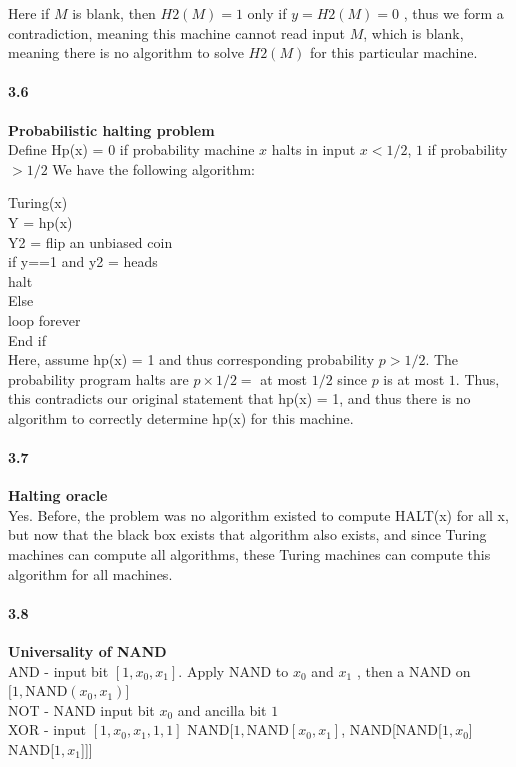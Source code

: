 Here if $M$ is blank, then $H2(M) = 1$ only if $y = H2(M) = 0$ , thus we form a contradiction, meaning this machine cannot read input $M$, which is blank, meaning there is no algorithm to solve $H2(M)$ for this particular machine.


\paragraph{3.6} \textbf{Probabilistic halting problem}
\\

Define Hp(x) = {$0$ if probability machine $x$ halts in input $x<1/2$, $1$ if probability $ > 1/2$ }
We have the following algorithm:

Turing(x) \\
Y = hp(x) \\
Y2 = flip an unbiased coin \\
if y==1 and y2 = heads \\
halt \\
Else \\
loop forever \\
End if\\

Here, assume hp(x) = 1 and thus corresponding probability $p > 1/2$. The probability program halts are $p \times 1/2 =$ at most $1/2$ since $p$ is at most $1$. Thus, this contradicts our original statement that hp(x) = 1, and thus there is no algorithm to correctly determine hp(x) for this machine.

\paragraph{3.7} \textbf{Halting oracle}
\\

Yes. Before, the problem was no algorithm existed to compute HALT(x) for all x, but now that the black box exists that algorithm also exists, and since Turing machines can compute all algorithms, these Turing machines can compute this algorithm for all machines.

\paragraph{3.8} \textbf{Universality of NAND}
\\

AND - input bit $[1,x_0, x_1]$. Apply NAND to $x_0$ and $x_1$ , then a NAND on $[1, \text{NAND}(x_0, x_1)$] \\
NOT - NAND input bit $x_0$ and ancilla bit $1$ \\
XOR - input $[1,x_0, x_1,1,1]$ NAND$[1,\text{NAND}[x_0,x_1]$,  NAND[NAND[$1, x_0$] NAND[$1, x_1$]]]


